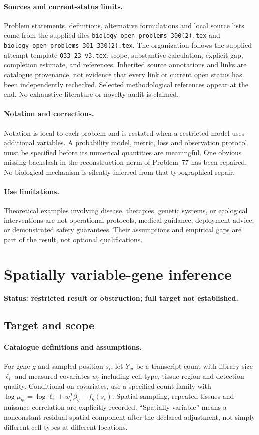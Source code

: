 \documentclass[11pt]{article}
\begin{document}
\paragraph{Sources and current-status limits.}
Problem statements, definitions, alternative formulations and local source lists
come from the supplied files
\texttt{biology\_open\_problems\_300(2).tex} and
\texttt{biology\_open\_problems\_301\_330(2).tex}.
The organization follows the supplied attempt template
\texttt{O33-23\_v3.tex}: scope, substantive calculation, explicit gap,
completion estimate, and references. Inherited source annotations and links are
catalogue provenance, not evidence that every link or current open status has
been independently rechecked. Selected methodological references appear at the
end. No exhaustive literature or novelty audit is claimed.

\paragraph{Notation and corrections.}
Notation is local to each problem and is restated when a restricted model uses
additional variables. A probability model, metric, loss and observation protocol
must be specified before its numerical quantities are meaningful. One obvious
missing backslash in the reconstruction norm of Problem~77 has been repaired.
No biological mechanism is silently inferred from that typographical repair.

\paragraph{Use limitations.}
Theoretical examples involving disease, therapies, genetic systems, or ecological
interventions are not operational protocols, medical guidance, deployment advice,
or demonstrated safety guarantees. Their assumptions and empirical gaps are part
of the result, not optional qualifications.


\section*{Spatially variable-gene inference}
\label{prob:075}
\noindent\textbf{Status: restricted result or obstruction; full target not established.}
\subsection{Target and scope}
\paragraph{Catalogue definitions and assumptions.}
For gene $g$ and sampled position $s_i$, let $Y_{gi}$ be a transcript count with library size $\ell_i$ and measured covariates $w_i$ including cell type, tissue region and detection quality. Conditional on covariates, use a specified count family with $\log\mu_{gi}=\log\ell_i+w_i^T\beta_g+f_g(s_i)$. Spatial sampling, repeated tissues and nuisance correlation are explicitly recorded. ``Spatially variable'' means a nonconstant residual spatial component after the declared adjustment, not simply different cell types at different locations.
\end{document}
